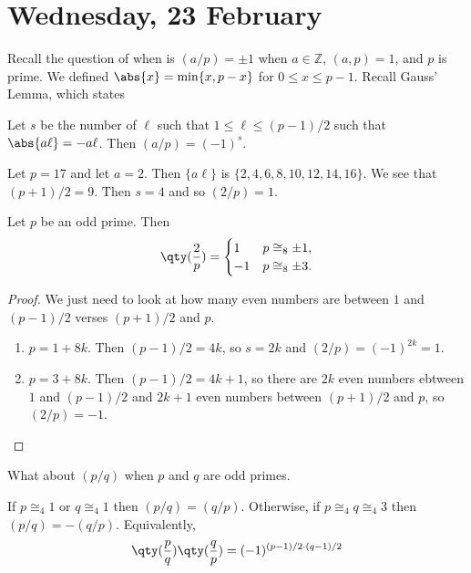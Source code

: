 
\section{Wednesday, 23 February}

Recall the question of when is $(a/p) = \pm1$ when $a\in\mathbb{Z}$, $(a,p) = 1$, and $p$ is prime. We defined $\abs{x} = \min\{x, p-x\}$ for $0 \leq x \leq p-1$. Recall Gauss' Lemma, which states

\begin{lemma}[Gauss]
Let $s$ be the number of $\ell$ such that $1 \leq \ell \leq (p-1)/2$ such that $\abs{a\ell} = -a\ell$. Then $(a/p) = (-1)^s$.
\end{lemma}

\begin{example}
Let $p = 17$ and let $a = 2$. Then $\{a\ell\}$ is $\{2, 4, 6, 8, 10, 12, 14, 16\}$. We see that $(p+1)/2 = 9$. Then $s=4$ and so $(2/p) = 1$.
\end{example}

\begin{theorem}
Let $p$ be an odd prime. Then 
\[
	\qty(\frac{2}{p}) = \begin{cases}
		1 & p \cong_8 \pm 1, \\
		-1 & p \cong_8 \pm 3.
	\end{cases}
\]
\end{theorem}

\begin{proof}
We just need to look at how many even numbers are between $1$ and $(p-1)/2$ verses $(p+1)/2$ and $p$.
\begin{enumerate}
\item[\textbf{Case 1:}] $p = 1 + 8k$. Then $(p-1)/2 = 4k$, so $s = 2k$ and $(2/p) = (-1)^{2k} = 1$.
\item[\textbf{Case 3:}] $p = 3 + 8k$. Then $(p-1)/2 = 4k + 1$, so there are $2k$ even numbers ebtween $1$ and $(p-1)/2$ and $2k+1$ even numbers between $(p+1)/2$ and $p$, so $(2/p) = -1$. \qedhere
\end{enumerate}
\end{proof}

What about $(p/q)$ when $p$ and $q$ are odd primes.

\begin{theorem}
If $p \cong_4 1$ or $q \cong_4 1$ then $(p/q) = (q/p)$. Otherwise, if $p \cong_4 q \cong_4 3$ then $(p/q) = -(q/p)$. Equivalently,
\[ \qty(\frac{p}{q})\qty(\frac{q}{p}) = (-1)^{(p-1)/2 \cdot (q-1)/2} \]
\end{theorem}

